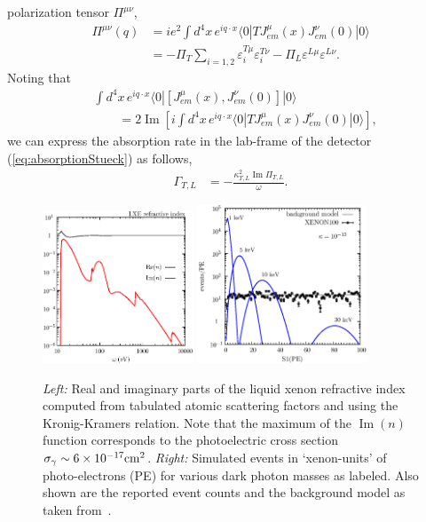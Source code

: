 \documentclass[prd,reprint,nofootinbib,notitlepage,aps,tightenlines,preprintnumbers,amsmath,amssymb,showpacs,superscriptaddress]{revtex4-1}
\DeclareMathOperator{\imag}{Im}
\begin{document}
polarization tensor $\Pi^{\mu\nu}$,
%
\begin{align}
\label{eq:poltensor}
  \Pi^{\mu\nu}(q) &= i e^2 \int d^4x\, e^{i q\cdot x} \langle 0 |
  T J^{\mu}_{em} (x) J^{\nu}_{em} (0) | 0 \rangle \nonumber \\
  & = - \Pi_T
  \sum_{i=1,2} \varepsilon_i^{T\mu} \varepsilon_i^{T\nu} -
  \Pi_L\varepsilon^{L\mu} \varepsilon^{L\nu} .
\end{align}
%
Noting that
%
\begin{align}
  &\int d^4x\,e^{i q\cdot x}  \langle 0 | [ J^{\mu}_{em} (x) , J^{\nu}_{em} (0) ] | 0
  \rangle \nonumber\\
  &\qquad = 2 \imag{ \left[ i \int d^4x\,e^{i q\cdot x}  \langle 0 | T J^{\mu}_{em}
      (x) J^{\nu}_{em} (0) | 0 \rangle \right] },
\end{align}
%
we can express the absorption rate in the lab-frame of the
detector (\ref{eq:absorptionStueck}) as follows,
%
\begin{align}
\label{eq:Gamma}
\Gamma_{T,L} & = - \frac{\kappa_{T,L}^2 \imag{\Pi_{T,L}}}{\omega} . 
\end{align}

%
\begin{figure}
\centering
\includegraphics[width=0.40\textwidth]{ALP_n.eps}%
\includegraphics[width=0.45\textwidth]{DM_S1.eps}%
\caption{\footnotesize \textit{Left:} Real and imaginary parts of the
  liquid xenon refractive index computed from tabulated atomic
  scattering factors and using the Kronig-Kramers relation. Note that
  the maximum of the $\imag (n)$ function corresponds to the
  photoelectric cross section
  $\sigma_\gamma \sim 6\times 10^{-17}{\rm cm}^2$.  \textit{Right:}
  Simulated events in `xenon-units' of photo-electrons (PE) for
  various dark photon masses as labeled. Also shown are the reported
  event counts and the background model as taken
  from~\cite{Aprile:2014eoa}.}
\label{fig:xs}
\end{figure}
\end{document}
